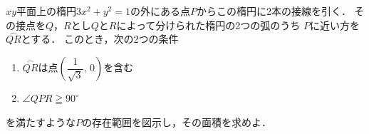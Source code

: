 \documentclass[../../main.tex]{subfiles}
\begin{document}
$xy$平面上の楕円$3x^2+y^2=1$の外にある点$P$からこの楕円に2本の接線を引く．
その接点を$Q$，$R$とし$Q$と$R$によって分けられた楕円の2つの弧のうち
$P$に近い方を$\stackrel{\frown}{QR}$とする．
このとき，次の2つの条件
\begin{enumerate}
  \item $\stackrel{\frown}{QR}$は点$\displaystyle\left(\dfrac{1}{\sqrt{3}}, \, 0\right)$を含む
  \item $\angle QPR\geqq{90}^\circ$
\end{enumerate}
を満たすような$P$の存在範囲を図示し，その面積を求めよ．
\end{document}
